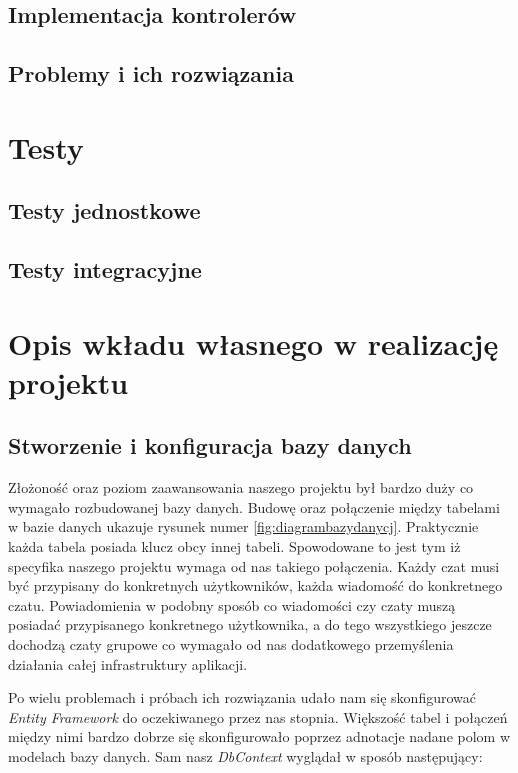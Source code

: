 \documentclass[12pt,a4paper]{article}
\begin{document}
\subsection{Implementacja kontrolerów}		%
\subsection{Problemy i ich rozwiązania}		%

\section{Testy}

\subsection{Testy jednostkowe}   %
\subsection{Testy integracyjne}  %

\section{Opis wkładu własnego w realizację projektu}

\subsection{Stworzenie i konfiguracja bazy danych}

\hspace*{0.7cm} Złożoność oraz poziom zaawansowania naszego projektu był bardzo duży co wymagało rozbudowanej bazy danych. Budowę oraz połączenie między tabelami w bazie danych ukazuje rysunek numer \ref{fig:diagrambazydanycj}. Praktycznie każda tabela posiada klucz obcy innej tabeli. Spowodowane to jest tym iż specyfika naszego projektu wymaga od nas takiego połączenia. Każdy czat musi być przypisany do konkretnych użytkowników, każda wiadomość do konkretnego czatu. Powiadomienia w podobny sposób co wiadomości czy czaty muszą posiadać przypisanego konkretnego użytkownika, a do tego wszystkiego jeszcze dochodzą czaty grupowe co wymagało od nas dodatkowego przemyślenia działania całej infrastruktury aplikacji.\newline

\hspace*{0.7cm} Po wielu problemach i próbach ich rozwiązania udało nam się skonfigurować \textit{Entity Framework} do oczekiwanego przez nas stopnia. Większość tabel i połączeń między nimi bardzo dobrze się skonfigurowało poprzez adnotacje nadane polom w modelach bazy danych. Sam nasz \textit{DbContext} wyglądał w sposób następujący:\newline
\end{document}
